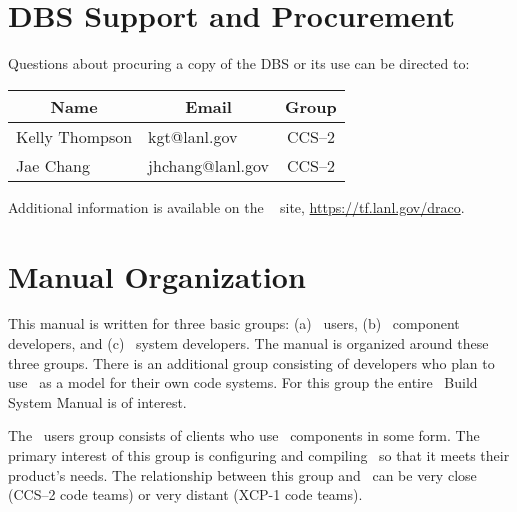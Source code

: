 \section{DBS Support and Procurement}

Questions about procuring a copy of the DBS or its use can be
directed to:
\begin{center}
  \begin{tabular}{llc}\hline\hline
    \multicolumn{1}{c}{Name} & \multicolumn{1}{c}{Email} &
    Group \\ \hline
    Kelly Thompson & kgt@lanl.gov     & CCS--2 \\
    Jae Chang      & jhchang@lanl.gov & CCS--2 \\ \hline\hline
  \end{tabular}
\end{center}
Additional information is available on the \draco\ 
site, \href{https://tf.lanl.gov/draco}{https://tf.lanl.gov/draco}.


\section{Manual Organization}

This manual is written for three basic groups: (a) \draco\ users, (b)
\draco\ component developers, and (c) \draco\ system developers. The
manual is organized around these three groups. There is an additional
group consisting of developers who plan to use \draco\ as a model for
their own code systems.  For this group the entire \draco\ Build
System Manual is of interest.

The \draco\ users group consists of clients who use \draco\ components
in some form.  The primary interest of this group is configuring  and
compiling  \draco\ so that it meets their product's needs.  The
relationship between this group and \draco\ can be very close (CCS--2
code teams) or very distant (XCP-1 code teams).

